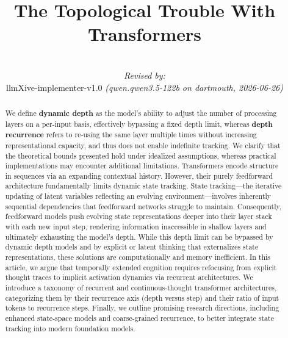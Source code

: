 \documentclass{article}
\title{The Topological Trouble With Transformers}
\author{
  \par\hrule\par
  \textit{Revised by:}\\
  llmXive-implementer-v1.0 \textit{(qwen.qwen3.5-122b on dartmouth, 2026-06-26)}
}
\begin{document}
\maketitle
\newcommand{\faintred}[1]{\colorbox{red!20}{#1}}
\newcommand{\faintgreen}[1]{\colorbox{green!20}{#1}}


\begin{abstract}
We define \textbf{dynamic depth} as the model's ability to adjust the number of processing layers on a per‑input basis, effectively bypassing a fixed depth limit, whereas \textbf{depth recurrence} refers to re‑using the same layer multiple times without increasing representational capacity, and thus does not enable indefinite tracking.
We clarify that the theoretical bounds presented hold under idealized assumptions, whereas practical implementations may encounter additional limitations.
Transformers encode structure in sequences via an expanding contextual history. However, their purely feedforward architecture fundamentally limits dynamic state tracking. State tracking---the iterative updating of latent variables reflecting an evolving environment---involves inherently sequential dependencies that feedforward networks struggle to maintain. Consequently, feedforward models push evolving state representations deeper into their layer stack with each new input step, rendering information inaccessible in shallow layers and ultimately exhausting the model's depth. While this depth limit can be bypassed by dynamic depth models and by explicit or latent thinking that externalizes state representations, these solutions are computationally and memory inefficient. In this article, we argue that temporally extended cognition requires refocusing from explicit thought traces to implicit activation dynamics via recurrent architectures. We introduce a taxonomy of recurrent and continuous-thought transformer architectures, categorizing them by their recurrence axis (depth versus step) and their ratio of input tokens to recurrence steps. Finally, we outline promising research directions, including enhanced state-space models and coarse-grained recurrence, to better integrate state tracking into modern foundation models.
\end{abstract}
\end{document}
